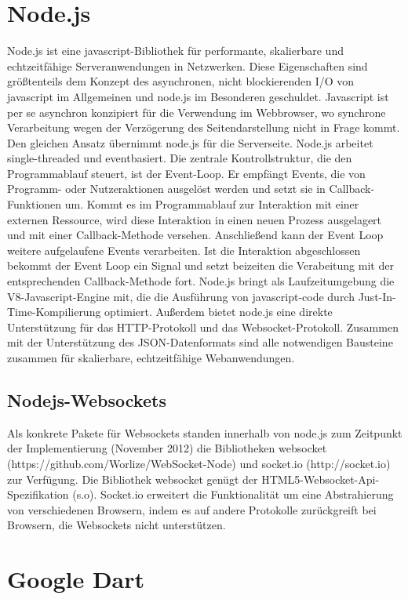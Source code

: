 \section{Node.js}\label{Node.js}
Node.js ist eine javascript-Bibliothek für performante, skalierbare und echtzeitfähige Serveranwendungen in Netzwerken. Diese Eigenschaften sind größtenteils dem Konzept des asynchronen, nicht blockierenden I/O von javascript im Allgemeinen und node.js im Besonderen geschuldet.
Javascript ist per se asynchron konzipiert für die Verwendung im Webbrowser, wo synchrone Verarbeitung wegen der Verzögerung des Seitendarstellung nicht in Frage kommt. Den gleichen Ansatz übernimmt node.js für die Serverseite.
Node.js arbeitet single-threaded und eventbasiert. Die zentrale Kontrollstruktur, die den Programmablauf steuert, ist der Event-Loop. Er empfängt Events, die von Programm- oder Nutzeraktionen ausgelöst werden und setzt sie in Callback-Funktionen um.
Kommt es im Programmablauf zur Interaktion mit einer externen Ressource, wird diese Interaktion in einen neuen Prozess ausgelagert und mit einer Callback-Methode versehen. Anschließend kann der Event Loop weitere aufgelaufene Events verarbeiten. Ist die Interaktion abgeschlossen bekommt der Event Loop ein Signal und setzt beizeiten die Verabeitung mit der entsprechenden Callback-Methode  fort.
Node.js bringt als Laufzeitumgebung die V8-Javascript-Engine mit, die die Ausführung von javascript-code durch Just-In-Time-Kompilierung optimiert. Außerdem bietet node.js eine direkte Unterstützung für das HTTP-Protokoll und das Websocket-Protokoll. Zusammen mit der Unterstützung des JSON-Datenformats sind alle notwendigen Bausteine zusammen für skalierbare, echtzeitfähige Webanwendungen.

\subsection{Nodejs-Websockets}\label{s.Nodejs-Websockets}
Als konkrete Pakete für Websockets standen innerhalb von node.js zum Zeitpunkt der Implementierung (November 2012) die Bibliotheken websocket (https://github.com/Worlize/WebSocket-Node) und socket.io (http://socket.io) zur Verfügung. Die Bibliothek websocket genügt der HTML5-Websocket-Api-Spezifikation (s.o). Socket.io erweitert die Funktionalität um eine Abstrahierung von verschiedenen Browsern, indem es auf andere Protokolle zurückgreift bei Browsern, die Websockets nicht unterstützen.


\section{Google Dart}\label{s.Google Dart }

